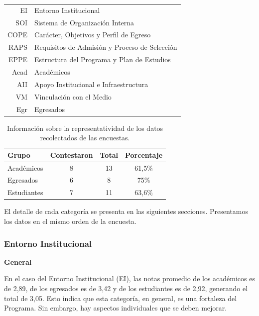 \begin{table}[!ht]
\centering
\label{acronyms}
\begin{tabular}{rl}
EI   & Entorno Institucional                         \\
SOI  & Sistema de Organización Interna               \\
COPE & Carácter, Objetivos y Perfil de Egreso        \\
RAPS & Requisitos de Admisión y Proceso de Selección \\
EPPE & Estructura del Programa y Plan de Estudios    \\
Acad & Académicos                                    \\
AII  & Apoyo Institucional e Infraestructura         \\
VM   & Vinculación con el Medio                      \\
Egr  & Egresados                                    
\end{tabular}
\end{table}

\begin{table}[!ht]
\centering
\caption{Información sobre la representatividad de los datos recolectados de las encuestas.}
\label{representatividad_encuestas}
\begin{tabular}{lccc}
\hline
Grupo       & Contestaron & Total & Porcentaje \\ \hline \hline
Académicos  & 8 & 13 & 61,5\% \\
Egresados   & 6 & 8 & 75\% \\
Estudiantes & 7 & 11 & 63,6\% \\
\hline
\end{tabular}
\end{table}


El detalle de cada categoría se presenta en las siguientes secciones. Presentamos los datos en el mismo orden de la encuesta.



\subsubsection{Entorno Institucional}

\noindent\textbf{General}

En el caso del Entorno Institucional (EI), las notas promedio de los 
académicos es de 2,89, de los egresados es de 3,42 
y de los estudiantes es de 2,92, generando el total de 3,05.
Esto indica que esta categoría, en general, es una fortaleza del Programa. Sin embargo, hay aspectos individuales 
que se deben mejorar. 

